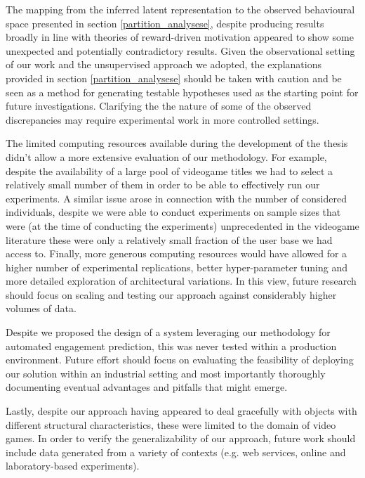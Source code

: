 The mapping from the inferred latent representation to the observed behavioural space  presented in section \ref{partition_analysese}, despite producing results broadly in line with theories of reward-driven motivation \cite{thorndike1927law,skinner1965science,berridge2004motivation} appeared to show some unexpected and potentially contradictory results. Given the observational setting of our work and the unsupervised approach we adopted, the explanations provided in section \ref{partition_analysese} should be taken with caution and be seen as a method for generating testable hypotheses used as the starting point for future investigations. Clarifying the the nature of some of the observed discrepancies may require experimental work in more controlled settings. 

The limited computing resources available during the development of the thesis didn't allow a more extensive evaluation of our methodology. For example, despite the availability of a large pool of videogame titles we had to select a relatively small number of them in order to be able to effectively run our experiments. A similar issue arose in connection with the number of considered individuals, despite we were able to conduct experiments on sample sizes that were (at the time of conducting the experiments) unprecedented in the videogame literature these were only a relatively small fraction of the user base we had access to. Finally, more generous computing resources would have allowed for a higher number of experimental replications, better hyper-parameter tuning and more detailed exploration of architectural variations. In this view, future research should focus on scaling and testing our approach against considerably higher volumes of data.

Despite we proposed the design of a system leveraging our methodology for automated engagement prediction, this was never tested within a production environment. Future effort should focus on evaluating the feasibility of deploying our solution within an industrial setting and most importantly thoroughly documenting eventual advantages and pitfalls that might emerge.

Lastly, despite our approach having appeared to deal gracefully with objects with different structural characteristics, these were limited to the domain of video games. In order to verify the generalizability of our approach, future work should include data generated from a variety of contexts (e.g. web services, online and laboratory-based experiments).  


